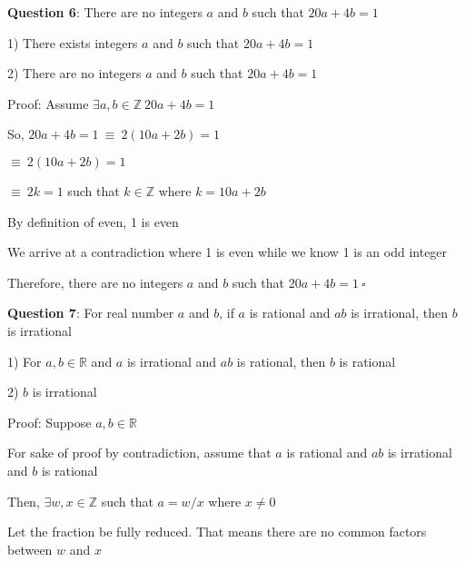 \documentclass{article} %
\newcommand{\question}[2][]{\begin{flushleft}
        \textbf{Question #1}: #2
\end{flushleft}}
\begin{document}
    \question[6]{There are no integers $a$ and $b$ such that $20a + 4b = 1$}

    1) There exists integers $a$ and $b$ such that $20a + 4b = 1$

    2) There are no integers $a$ and $b$ such that $20a + 4b = 1$

    \vspace*{0.3cm}

    Proof: Assume $\exists a, b \in \mathbb{Z}\ 20a + 4b = 1$

    So, $20a + 4b = 1\ \equiv\ 2(10a + 2b) = 1$

    \tabto{3.26cm}$\equiv\ 2(10a + 2b) = 1$

    \tabto{3.26cm}$\equiv\ 2k = 1$ such that $k \in \mathbb{Z}$ where $k = 10a + 2b$

    By definition of even, 1 is even

    We arrive at a contradiction where 1 is even while we know 1 is an odd integer

    Therefore, there are no integers $a$ and $b$ such that $20a + 4b = 1\ \square$ 



                                                                   

    \question[7]{For real number $a$ and $b$, if $a$ is rational and $ab$ is irrational, then $b$ is irrational}

    1) For $a, b \in \mathbb{R}$ and $a$ is irrational and $ab$ is rational, then $b$ is rational

    2) $b$ is irrational

    \vspace*{0.3cm}

    Proof: Suppose $a, b \in \mathbb{R}$

    For sake of proof by contradiction, assume that $a$ is rational and $ab$ is irrational and $b$ is rational
    
    Then, $\exists w, x \in \mathbb{Z}$ such that $a = w/x$ where $x \neq 0$

    Let the fraction be fully reduced. That means there are no common factors between $w$ and $x$
    
\end{document}
